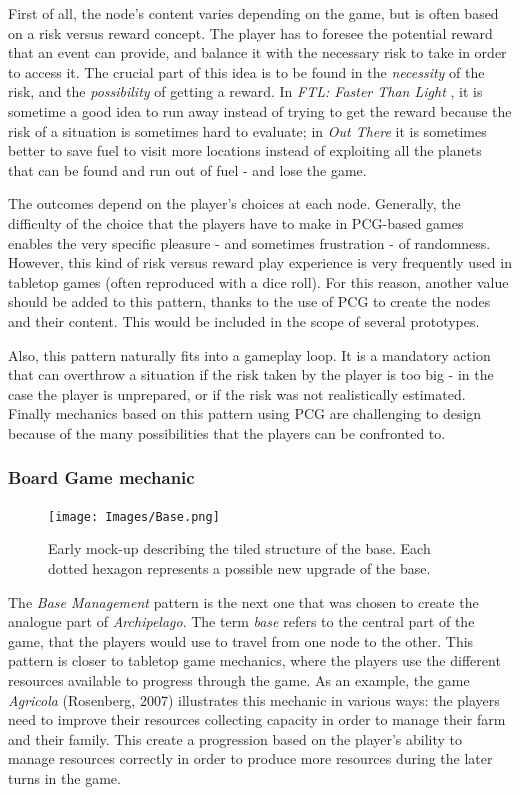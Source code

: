 First of all, the node's content varies depending on the game, but is often based on a risk versus reward concept. The player has to foresee the potential reward that an event can provide, and balance it with the necessary risk to take in order to access it. The crucial part of this idea is to be found in the \textit{necessity} of the risk, and the \textit{possibility} of getting a reward. In \textit{FTL: Faster Than Light} \cite{game:ftl}, it is sometime a good idea to run away instead of trying to get the reward because the risk of a situation is sometimes hard to evaluate; in \textit{Out There}\cite{game:outthere} it is sometimes better to save fuel to visit more locations instead of exploiting all the planets that can be found and run out of fuel - and lose the game.

The outcomes depend on the player's choices at each node. Generally, the difficulty of the choice that the players have to make in PCG-based games enables the very specific pleasure - and sometimes frustration - of randomness. However, this kind of risk versus reward play experience is very frequently used in tabletop games (often reproduced with a dice roll). For this reason, another value should be added to this pattern, thanks to the use of PCG to create the nodes and their content. This would be included in the scope of several prototypes.

Also, this pattern naturally fits into a gameplay loop. It is a mandatory action that can overthrow a situation if the risk taken by the player is too big - in the case the player is unprepared, or if the risk was not realistically estimated. Finally mechanics based on this pattern using PCG are challenging to design because of the many possibilities that the players can be confronted to. 
\subsubsection{Board Game mechanic}
\begin{figure}[h]
    \centering
    \texttt{[image: Images/Base.png]}
    \caption{Early mock-up describing the tiled structure of the base. Each dotted hexagon represents a possible new upgrade of the base.}
    \label{fig:base}
\end{figure}
The \textit{Base Management} pattern is the next one that was chosen to create the analogue part of \textit{Archipelago}. The term \textit{base} refers to the central part of the game, that the players would use to travel from one node to the other. This pattern is closer to tabletop game mechanics, where the players use the different resources available to progress through the game. As an example, the game \textit{Agricola} (Rosenberg, 2007) \cite{game:agri} illustrates this mechanic in various ways: the players need to improve their resources collecting capacity in order to manage their farm and their family. This create a progression based on the player's ability to manage resources correctly in order to produce more resources during the later turns in the game.

